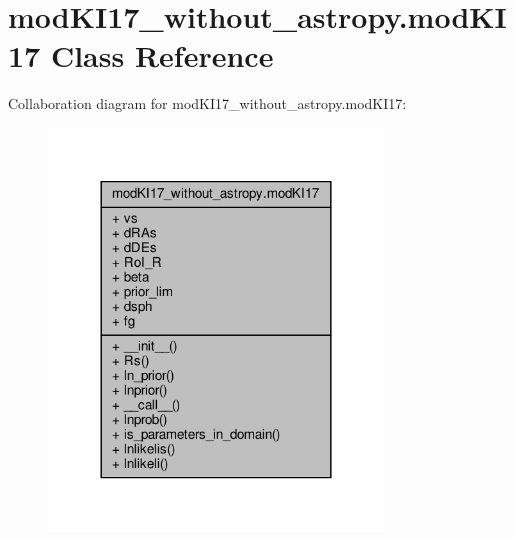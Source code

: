 \hypertarget{classmodKI17__without__astropy_1_1modKI17}{}\section{mod\+K\+I17\+\_\+without\+\_\+astropy.\+mod\+K\+I17 Class Reference}
\label{classmodKI17__without__astropy_1_1modKI17}


Collaboration diagram for mod\+K\+I17\+\_\+without\+\_\+astropy.\+mod\+K\+I17\+:\nopagebreak
\begin{figure}[H]
\begin{center}
\leavevmode
\includegraphics[width=252pt]{d2/d79/classmodKI17__without__astropy_1_1modKI17__coll__graph}
\end{center}
\end{figure}
